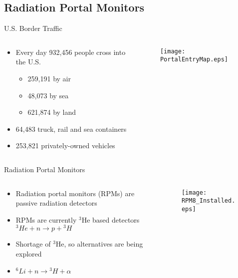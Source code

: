 \subsection{Radiation Portal Monitors}
\begin{frame}{U.S. Border Traffic}
\begin{columns}[onlytextwidth]
\begin{column}{0.45\textwidth}
  \begin{itemize}
  \item Every day 932,456 people cross into the U.S. \cite{cpb_typical_2012}
    \begin{itemize}
    	\item 259,191 by air
	\item 48,073 by sea
	\item 621,874 by land
    \end{itemize}
  \item 64,483 truck, rail and sea containers \cite{cpb_typical_2012}
 \item 253,821 privately-owned vehicles \cite{cpb_typical_2012}
  \end{itemize}
\end{column}
\begin{column}{0.45\textwidth}
  \begin{figure}[ht]
    \vspace*{-3cm}
		\texttt{[image: PortalEntryMap.eps]}
  \end{figure}
\end{column}
\end{columns}
\end{frame}

\begin{frame}{Radiation Portal Monitors}
\begin{columns}[onlytextwidth]
	\begin{column}{0.45\textwidth}
  	\begin{itemize}
  		\item Radiation portal monitors (RPMs) are passive radiation detectors
  		\item {
  			 RPMs are currently   ${}^3$He based detectors
  			\center
    		${}^3He +n \to p +{}^3H$
    	}
  		\item Shortage of ${}^3$He, so alternatives are being explored
		  \item ${}^6Li + n \to {}^3H + \alpha$    
  		\end{itemize}
	\end{column}
	\begin{column}{0.5\textwidth}
		\begin{figure}
    \vspace*{-3cm}
      \centering
			\texttt{[image: RPM8\_Installed.eps]}
    \end{figure}
	\end{column}
\end{columns}
\end{frame}

